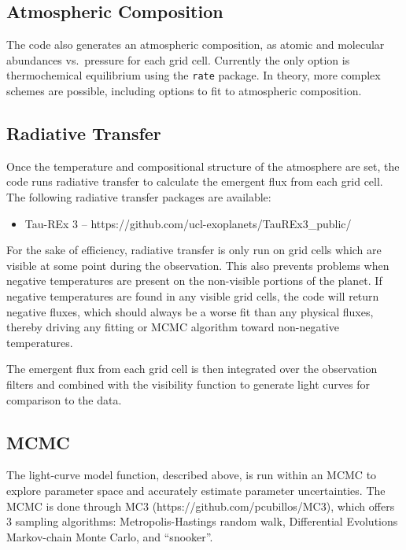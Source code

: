 \documentclass[12pt]{article}
\begin{document}
\subsection{Atmospheric Composition}

The code also generates an atmospheric composition, as atomic and
molecular abundances vs.\ pressure for each grid cell. Currently
the only option is thermochemical equilibrium using the \texttt{rate}
package. In theory, more complex schemes are possible, including
options to fit to atmospheric composition.

\subsection{Radiative Transfer}

Once the temperature and compositional structure of the atmosphere are
set, the code runs radiative transfer to calculate the emergent flux
from each grid cell. The following radiative transfer packages are
available:

\begin{itemize}
\item Tau-REx 3 -- https://github.com/ucl-exoplanets/TauREx3\_public/
\end{itemize}

For the sake of efficiency, radiative transfer is only run on grid
cells which are visible at some point during the observation. This
also prevents problems when negative temperatures are present on the
non-visible portions of the planet. If negative temperatures are found
in any visible grid cells, the code will return negative fluxes, which
should always be a worse fit than any physical fluxes, thereby driving
any fitting or MCMC algorithm toward non-negative temperatures.

The emergent flux from each grid cell is then integrated over the
observation filters and combined with the visibility function to
generate light curves for comparison to the data.

\subsection{MCMC}

The light-curve model function, described above, is run within an MCMC
to explore parameter space and accurately estimate parameter
uncertainties.  The MCMC is done through MC3
(https://github.com/pcubillos/MC3), which offers 3 sampling
algorithms: Metropolis-Hastings random walk, Differential Evolutions
Markov-chain Monte Carlo, and ``snooker''.
\end{document}
